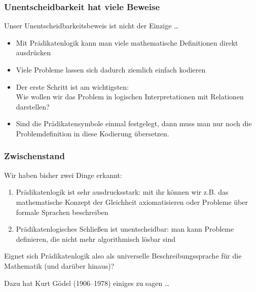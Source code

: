 \documentclass[aspectratio=1610,onlymath]{beamer}
\begin{document}
\begin{frame}\frametitle{Unentscheidbarkeit hat viele Beweise}

Unser Unentscheidbarkeitsbeweis ist nicht der Einzige \ldots
\begin{itemize}
\item Mit Prädikatenlogik kann man viele mathematische Definitionen
direkt ausdrücken
\item Viele Probleme lassen sich dadurch ziemlich einfach kodieren
\item Der erste Schritt ist am wichtigsten:\\
	Wie wollen wir das Problem in logischen Interpretationen mit Relationen darstellen?
\item Sind die Prädikatensymbole einmal festgelegt, dann muss man nur noch
die Problemdefinition in diese Kodierung übersetzen.
\end{itemize}\pause


\end{frame}


\begin{frame}\frametitle{Zwischenstand}

Wir haben bisher zwei Dinge erkannt:
\begin{enumerate}[(1)]
\item \alert{Prädikatenlogik ist sehr ausdrucksstark:}
mit ihr können wir z.B. das mathematische Konzept der Gleichheit axiomatisieren oder
Probleme über formale Sprachen beschreiben
\item \alert{Prädikatenlogisches Schließen ist unentscheidbar:}
man kann Probleme definieren, die nicht mehr algorithmisch lösbar sind
\end{enumerate}

Eignet sich Prädikatenlogik also als universelle Beschreibungssprache für
die Mathematik (und darüber hinaus)?
\bigskip

Dazu hat Kurt Gödel (1906--1978) einiges zu sagen \ldots

\end{frame}
\end{document}
